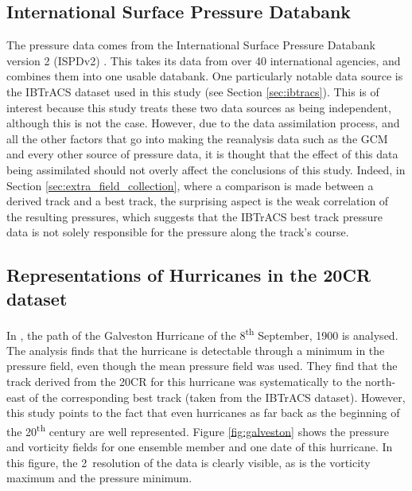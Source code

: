 \documentclass[pdftex,12pt,a4paper]{report}
\newcommand{\ts}{\textsuperscript}
\begin{document}
\subsection{International Surface Pressure Databank}
The pressure data comes from the International Surface Pressure Databank version 2 (ISPDv2)
\parencite{yin2008international}. This takes its data from over 40 international agencies, and
combines them into one usable databank. One particularly notable data source is the IBTrACS dataset
used in this study (see Section \ref{sec:ibtracs}). This is of interest because this study treats
these two data sources as being independent, although this is not the case. However, due to the data
assimilation process, and all the other factors that go into making the reanalysis data such as the
GCM and every other source of pressure data, it is thought that the effect of this data being
assimilated should not overly affect the conclusions of this study. Indeed, in Section
\ref{sec:extra_field_collection}, where a comparison is made between a derived track and a best
track, the surprising aspect is the weak correlation of the resulting pressures, which suggests
that the IBTrACS best track pressure data is not solely responsible for the pressure along the
track's course.


\subsection{Representations of Hurricanes in the 20CR dataset}

In \textcite{neff2013analysis}, the path of the Galveston Hurricane of the 8\ts{th} September, 1900
is analysed. The analysis finds that the hurricane is detectable through a minimum in the pressure
field, even though the mean pressure field was used. They find that the track derived from the 20CR
for this hurricane was systematically to the north-east of the corresponding best track (taken from
the IBTrACS dataset). However, this study points to the fact that even hurricanes as far back as the
beginning of the 20\ts{th} century are well represented. Figure \ref{fig:galveston} shows the
pressure and vorticity fields for one ensemble member and one date of this hurricane. In this
figure, the 2\textdegree\ resolution of the data is clearly visible, as is the vorticity maximum and
the pressure minimum.
\end{document}
